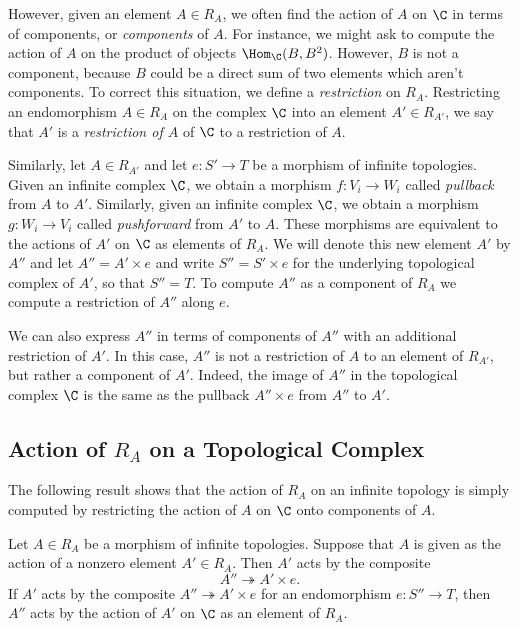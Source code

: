 \documentclass[a4paper,reqno,oneside]{article}
\begin{document}
However, given an element $A \in R_A$, we often find the action of $A$ on $\C$ in terms of components, or \textit{components} of $A$.  For instance, we might ask to compute the action of $A$ on the product of objects $\Hom_{\C}(B, B^2)$.  However, $B$ is not a component, because $B$ could be a direct sum of two elements which aren't components.  To correct this situation, we define a \textit{restriction} on $R_A$.  Restricting an endomorphism $A \in R_A$ on the complex $\C$ into an element $A' \in R_{A'}$, we say that $A'$ is a \textit{restriction of $A$} of $\C$ to a restriction of $A$.  

Similarly, let $A \in R_{A'}$ and let $e: S' \to T$ be a morphism of infinite topologies.  Given an infinite complex $\C$, we obtain a morphism $f: V_i \to W_i$ called \textit{pullback} from $A$ to $A'$.  Similarly, given an infinite complex $\C$, we obtain a morphism $g: W_i \to V_i$ called \textit{pushforward} from $A'$ to $A$.  These morphisms are equivalent to the actions of $A'$ on $\C$ as elements of $R_A$.   We will denote this new element $A'$ by $A''$ and let $A'' = A' \times e$ and write $S'' = S' \times e$ for the underlying topological complex of $A'$, so that $S'' = T$.  To compute $A''$ as a component of $R_A$ we compute a restriction of $A''$ along $e$.

We can also express $A''$ in terms of components of $A''$ with an additional restriction of $A'$.  In this case, $A''$ is not a restriction of $A$ to an element of $R_{A'}$, but rather a component of $A'$.  Indeed, the image of $A''$ in the topological complex $\C$ is the same as the pullback $A'' \times e$ from $A''$ to $A'$.

\subsection{Action of $R_A$ on a Topological Complex}

The following result shows that the action of $R_A$ on an infinite topology is simply computed by restricting the action of $A$ on $\C$ onto components of $A$.

\begin{lemma}
    Let $A \in R_A$ be a morphism of infinite topologies. 
    Suppose that $A$ is given as the action of a nonzero element $A' \in R_A$.  Then $A'$ acts by the composite
$$
A'' \twoheadrightarrow A' \times e.
$$
If $A'$ acts by the composite $A'' \twoheadrightarrow A' \times e$ for an endomorphism $e: S'' \to T$, then $A''$ acts by the action of $A'$ on $\C$ as an element of $R_A$.
\end{lemma}
\end{document}
